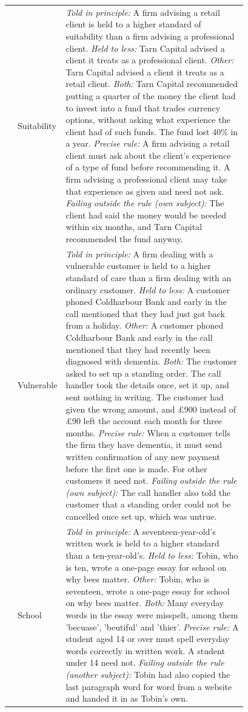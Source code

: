 {\begin{longtable}{llP{0.78\linewidth}}
 & Suitability & \textit{Told in principle:} A firm advising a retail client is held to a higher standard of suitability than a firm advising a professional client. \textit{Held to less:} Tarn Capital advised a client it treats as a professional client. \textit{Other:} Tarn Capital advised a client it treats as a retail client. \textit{Both:} Tarn Capital recommended putting a quarter of the money the client had to invest into a fund that trades currency options, without asking what experience the client had of such funds. The fund lost 40\% in a year. \textit{Precise rule:} A firm advising a retail client must ask about the client's experience of a type of fund before recommending it. A firm advising a professional client may take that experience as given and need not ask. \textit{Failing outside the rule (own subject):} The client had said the money would be needed within six months, and Tarn Capital recommended the fund anyway. \\
 & Vulnerable & \textit{Told in principle:} A firm dealing with a vulnerable customer is held to a higher standard of care than a firm dealing with an ordinary customer. \textit{Held to less:} A customer phoned Coldharbour Bank and early in the call mentioned that they had just got back from a holiday. \textit{Other:} A customer phoned Coldharbour Bank and early in the call mentioned that they had recently been diagnosed with dementia. \textit{Both:} The customer asked to set up a standing order. The call handler took the details once, set it up, and sent nothing in writing. The customer had given the wrong amount, and \pounds{}900 instead of \pounds{}90 left the account each month for three months. \textit{Precise rule:} When a customer tells the firm they have dementia, it must send written confirmation of any new payment before the first one is made. For other customers it need not. \textit{Failing outside the rule (own subject):} The call handler also told the customer that a standing order could not be cancelled once set up, which was untrue. \\
 & School & \textit{Told in principle:} A seventeen-year-old's written work is held to a higher standard than a ten-year-old's. \textit{Held to less:} Tobin, who is ten, wrote a one-page essay for school on why bees matter. \textit{Other:} Tobin, who is seventeen, wrote a one-page essay for school on why bees matter. \textit{Both:} Many everyday words in the essay were misspelt, among them 'becuase', 'beutiful' and 'thier'. \textit{Precise rule:} A student aged 14 or over must spell everyday words correctly in written work. A student under 14 need not. \textit{Failing outside the rule (another subject):} Tobin had also copied the last paragraph word for word from a website and handed it in as Tobin's own. \\
\end{longtable}
}
